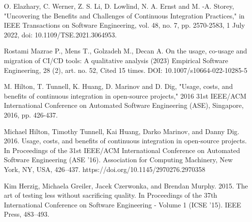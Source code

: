 \begin{thebibliography}{8}
O. Elazhary, C. Werner, Z. S. Li, D. Lowlind, N. A. Ernst and M. -A. Storey, "Uncovering the
Benefits and Challenges of Continuous Integration Practices," in IEEE Transactions on Software
Engineering, vol. 48, no. 7, pp. 2570-2583, 1 July 2022, doi: 10.1109/TSE.2021.3064953.

Rostami Mazrae P., Mens T., Golzadeh M., Decan A. On the usage, co-usage and migration of CI/CD
tools: A qualitative analysis (2023) Empirical Software Engineering, 28 (2), art. no. 52, Cited
15 times. DOI: 10.1007/s10664-022-10285-5

M. Hilton, T. Tunnell, K. Huang, D. Marinov and D. Dig, "Usage, costs, and benefits of continuous
integration in open-source projects," 2016 31st IEEE/ACM International Conference on Automated
Software Engineering (ASE), Singapore, 2016, pp. 426-437.

Michael Hilton, Timothy Tunnell, Kai Huang, Darko Marinov, and Danny Dig. 2016. Usage, costs, and
benefits of continuous integration in open-source projects. In Proceedings of the 31st IEEE/ACM
International Conference on Automated Software Engineering (ASE '16). Association for Computing
Machinery, New York, NY, USA, 426–437. https://doi.org/10.1145/2970276.2970358

Kim Herzig, Michaela Greiler, Jacek Czerwonka, and Brendan Murphy. 2015. The art of testing less
without sacrificing quality. In Proceedings of the 37th International Conference on Software
Engineering - Volume 1 (ICSE '15). IEEE Press, 483–493.

\end{thebibliography}